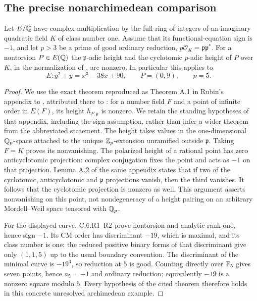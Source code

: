 \subsection{The precise nonarchimedean comparison}
\begin{statement}
Let $E/\mathbb Q$ have complex multiplication by the full ring of integers
of an imaginary quadratic field $K$ of class number one. Assume
that its functional-equation sign is $-1$, and let $p>3$ be a
prime of good ordinary reduction, $p\mathcal O_K=\mathfrak p
\mathfrak p^*$. For a nontorsion $P\in E(\mathbb Q)$ the
$\mathfrak p$-adic height and the cyclotomic $p$-adic height
of $P$ over $K$, in the normalization of
\citet[Appendix A]{agboola2006}, are nonzero.
In particular this applies to
\[
 E:y^2+y=x^3-38x+90,\qquad P=(0,9),\qquad p=5.
\]
\end{statement}
\begin{proof}
We use the exact theorem reproduced as Theorem A.1 in Rubin's
appendix to \citet{agboola2006}, attributed there to
\citet{bertrand1984}: for a number field $F$ and a point of
infinite order in $E(F)$, its height $h_{F,\mathfrak p}$ is
nonzero. We retain the standing hypotheses of that appendix,
including the sign assumption, rather than infer a wider theorem
from the abbreviated statement. The height takes values in
the one-dimensional $\mathbb Q_p$-space attached to the unique
$\mathbb Z_p$-extension unramified outside $\mathfrak p$.
Taking $F=K$ proves its nonvanishing. The polarized height of
a rational point has zero anticyclotomic projection: complex
conjugation fixes the point and acts as $-1$ on that projection.
Lemma A.2 of the same appendix states that if two of the
cyclotomic, anticyclotomic and $\mathfrak p$ projections
vanish, then the third vanishes. It follows that the cyclotomic
projection is nonzero as well. This argument asserts nonvanishing
on this point, not nondegeneracy of a height pairing on an
arbitrary Mordell--Weil space tensored with $\mathbb Q_p$.

For the displayed curve, C.6.R1--R2 prove nontorsion and
analytic rank one, hence sign $-1$. Its CM order has
discriminant $-19$, which is maximal, and its class number is
one: the reduced positive binary forms of that discriminant
give only $(1,1,5)$ up to the usual boundary convention.
The discriminant of the minimal curve is $-19^3$, so reduction
at $5$ is good. Counting directly over $\mathbb F_5$ gives seven
points, hence $a_5=-1$ and ordinary reduction; equivalently
$-19$ is a nonzero square modulo $5$. Every hypothesis of the
cited theorem therefore holds in this concrete unresolved
archimedean example.
\end{proof}

